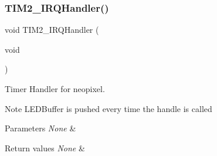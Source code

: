 \subsubsection{\texorpdfstring{T\+I\+M2\+\_\+\+I\+R\+Q\+Handler()}{TIM2\_IRQHandler()}}
{\footnotesize\ttfamily void T\+I\+M2\+\_\+\+I\+R\+Q\+Handler (\begin{DoxyParamCaption}\item[{void}]{ }\end{DoxyParamCaption})}



Timer Handler for neopixel. 

\begin{DoxyNote}{Note}
L\+E\+D\+Buffer is pushed every time the handle is called 
\end{DoxyNote}

\begin{DoxyParams}{Parameters}
{\em None} & \\
\hline
\end{DoxyParams}

\begin{DoxyRetVals}{Return values}
{\em None} & \\
\hline
\end{DoxyRetVals}
